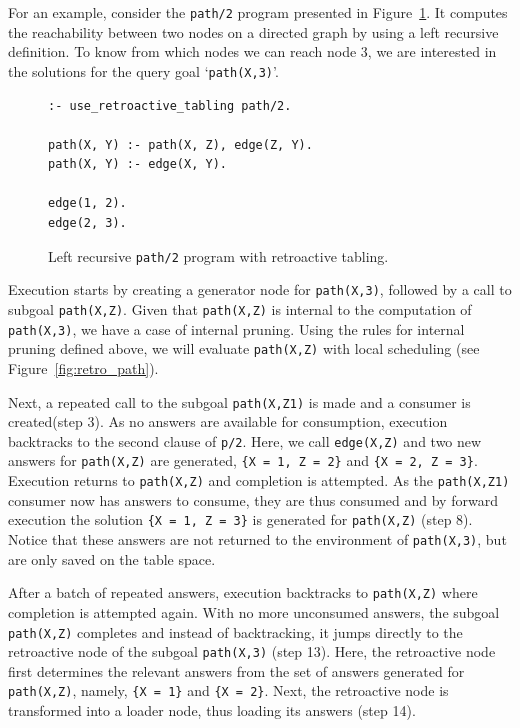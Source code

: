 For an example, consider the \texttt{path/2} program presented in Figure~\ref{fig:retro_path_program}.
It computes the reachability between two nodes on a directed graph by using a left recursive
definition. To know from which nodes we can reach node 3, we are interested in the solutions
for the query goal `\texttt{path(X,3)}'.

\begin{figure}[ht]
\begin{Verbatim}
:- use_retroactive_tabling path/2.

path(X, Y) :- path(X, Z), edge(Z, Y).
path(X, Y) :- edge(X, Y).

edge(1, 2).
edge(2, 3).
\end{Verbatim}
\caption{Left recursive \texttt{path/2} program with retroactive tabling.}
\label{fig:retro_path_program}
\end{figure}

Execution starts by creating a generator node for \texttt{path(X,3)}, followed by a call to
subgoal \texttt{path(X,Z)}. Given that \texttt{path(X,Z)} is internal to the computation of
\texttt{path(X,3)}, we have a case of internal pruning. Using the rules for internal pruning
defined above, we will evaluate \texttt{path(X,Z)} with local scheduling (see Figure~\ref{fig:retro_path}).

Next, a repeated call to the subgoal \texttt{path(X,Z1)} is made and a consumer is created(step 3).
As no answers are available for consumption, execution backtracks to the second clause of \texttt{p/2}.
Here, we call \texttt{edge(X,Z)} and two new answers for \texttt{path(X,Z)} are generated,
\texttt{\{X~=~1,~Z~=~2\}} and \texttt{\{X~=~2,~Z~=~3\}}. Execution returns to \texttt{path(X,Z)} and
completion is attempted. As the \texttt{path(X,Z1)} consumer now has answers to consume, they are
thus consumed and by forward execution the solution \texttt{\{X~=~1,~Z~=~3\}}  is generated for
\texttt{path(X,Z)} (step 8).
Notice that these answers are not returned to the environment of
\texttt{path(X,3)}, but are only saved on the table space.

After a batch of repeated answers, execution backtracks to \texttt{path(X,Z)} where
completion is attempted again. With no more unconsumed answers, the subgoal
\texttt{path(X,Z)} completes and instead of backtracking, it jumps directly to the retroactive node of the subgoal
\texttt{path(X,3)} (step 13).
Here, the retroactive node first determines the relevant answers from the set of
answers generated for \texttt{path(X,Z)}, namely, \texttt{\{X~=~1\}} and \texttt{\{X~=~2\}}. Next,
the retroactive node is transformed into a loader node, thus loading its answers
(step 14).

